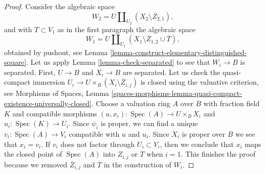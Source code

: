 \documentclass[10pt,a4paper]{amsart}
\theoremstyle{plain}
\theoremstyle{definition}
\theoremstyle{remark}
\numberwithin{equation}{subsection}
\def\Spec{\mathop{\mathrm{Spec}}}
\begin{document}
\begin{proof}
\medskip\noindent
Consider the algebraic space
$$
W_2 = U \coprod\nolimits_{U_2} (X_2 \setminus \overline{Z}_{2, 1}),
$$
and with $T \subset V_1$ as in the first paragraph the algebraic space
$$
W_1 = U \coprod\nolimits_{U_1}
(X_1 \setminus \overline{Z}_{1, 2} \cup \overline{T}),
$$
obtained by pushout, see
Lemma \ref{lemma-construct-elementary-distinguished-square}.
Let us apply Lemma \ref{lemma-check-separated}
to see that $W_i \to B$ is separated. First,
$U \to B$ and $X_i \to B$ are separated. Let us check the quasi-compact
immersion $U_i \to U \times_B (X_i \setminus \overline{Z}_{i, j})$
is closed using the valuative criterion, see Morphisms of Spaces, Lemma
\ref{spaces-morphisms-lemma-quasi-compact-existence-universally-closed}.
Choose a valuation ring $A$ over $B$ with fraction field $K$ and
compatible morphisms $(u, x_i) : \Spec(A) \to U \times_B X_i$ and
$u_i : \Spec(K) \to U_i$. Since $\psi_i$ is proper, we
can find a unique $v_i : \Spec(A) \to V_i$ compatible with
$u$ and $u_i$. Since $X_i$ is proper over $B$ we see that $x_i = v_i$.
If $v_i$ does not factor through $U_i \subset V_i$, then we conclude
that $x_i$ maps the closed point of $\Spec(A)$ into $Z_{i, j}$ or
$T$ when $i = 1$. This finishes the proof because we removed
$\overline{Z}_{i, j}$ and $\overline{T}$ in the construction of $W_i$.


\end{proof}
\end{document}
